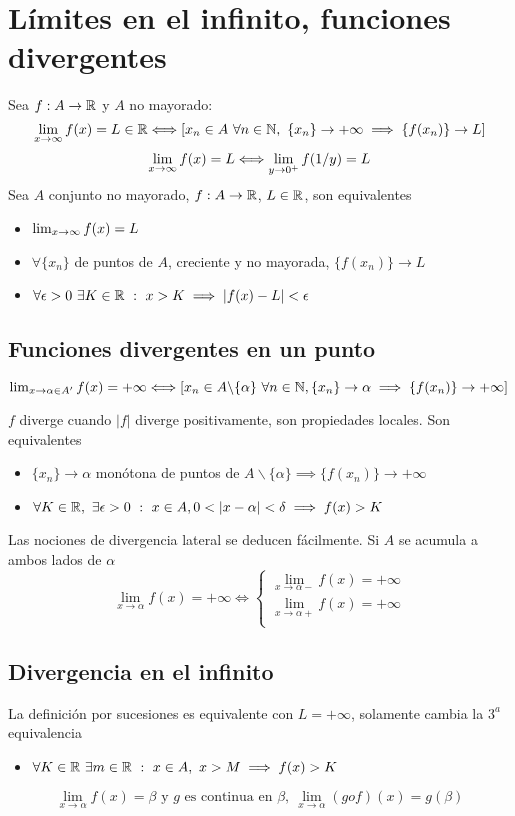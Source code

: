 \section{Límites en el infinito, funciones divergentes}
Sea $f:A\rightarrow\mathbb{R}$ y $A$ no mayorado:
$$ \lim_{\substack{x\rightarrow\infty}} f(x) = L\in\mathbb{R} \Longleftrightarrow
 [x_n\in A \ \forall n\in\mathbb{N}, \ \{x_n\}\rightarrow+\infty \implies \{f(x_n)\} \rightarrow L]$$
$$ \lim_{\substack{x\rightarrow\infty}} f(x) = L \Longleftrightarrow \lim_{y\rightarrow0^+} f(1/y) = L $$
Sea $A$ conjunto no mayorado, $f:A\rightarrow\mathbb{R}$, $L\in\mathbb{R}$, son equivalentes
\begin{itemize}
	\item $\lim_{\substack{x\rightarrow\infty}} f(x) = L$
	\item $\forall\{x_n\}$ de puntos de $A$, creciente y no mayorada, $\{f(x_n)\}\rightarrow L$
	\item $\forall\epsilon>0 \ \exists K\in\mathbb{R} \ : \ x>K \implies |f(x)-L|<\epsilon$
\end{itemize}

\subsection{Funciones divergentes en un punto}
\begin{center}
$ \lim_{x\rightarrow\alpha\in A'} f(x) = +\infty \Longleftrightarrow
[x_n\in A\backslash\{\alpha\} \ \forall n\in\mathbb{N}, \{x_n\}\rightarrow\alpha \implies \{f(x_n)\}\rightarrow+\infty] $
\end{center}

 
$f$ diverge cuando $|f|$ diverge positivamente, son propiedades locales. Son equivalentes
\begin{itemize}
	\item $\{x_n\}\rightarrow\alpha$ monótona de puntos de $A\backslash\{\alpha\} \implies \{f(x_n)\} \rightarrow +\infty$
	\item $\forall K\in\R, \ \exists\epsilon>0 \ : \ x\in A, 0<|x-\alpha|<\delta \implies f(x)>K$
\end{itemize}
Las nociones de divergencia lateral se deducen fácilmente. Si $A$ se acumula a ambos lados de $\alpha$
$$ \lim_{x\rightarrow\alpha} f(x) = +\infty \Longleftrightarrow 
\left\lbrace
\begin{array}{l}
 \lim_{x\rightarrow\alpha-} f(x) = +\infty \\
 \lim_{x\rightarrow\alpha+} f(x) = +\infty \\
\end{array}
\right.
$$

\subsection{Divergencia en el infinito}
La definición por sucesiones es equivalente con $L=+\infty$, solamente cambia la $3^a$ equivalencia
\begin{itemize}
	\item $\forall K\in\R \ \exists m\in\R \ : \ x\in A, \  x>M \implies f(x)>K$
\end{itemize}
$$\lim_{x\rightarrow\alpha} f(x)=\beta \text{ y $g$ es continua en $\beta$}, \ \lim_{x\rightarrow\alpha} (gof)(x) = g(\beta)$$
